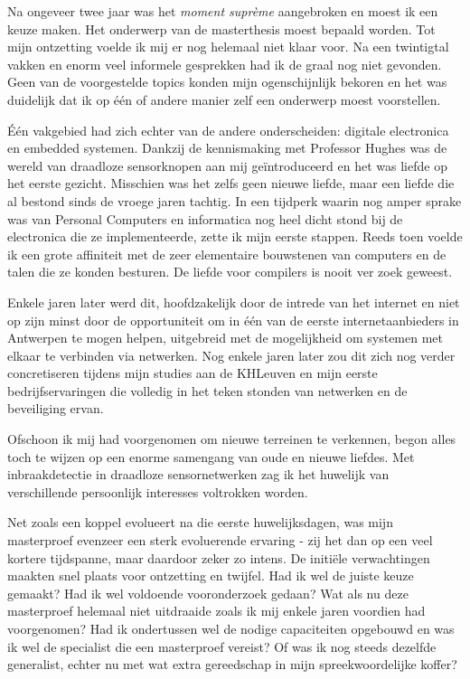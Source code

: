 Na ongeveer twee jaar was het \emph{moment supr\`eme} aangebroken en moest ik
een keuze maken. Het onderwerp van de masterthesis moest bepaald worden. Tot
mijn ontzetting voelde ik mij er nog helemaal niet klaar voor. Na een
twintigtal vakken en enorm veel informele gesprekken had ik de graal nog niet
gevonden. Geen van de voorgestelde topics konden mijn ogenschijnlijk bekoren en
het was duidelijk dat ik op \'e\'en of andere manier zelf een onderwerp moest
voorstellen.

\'E\'en vakgebied had zich echter van de andere onderscheiden: digitale
electronica en embedded systemen. Dankzij de kennismaking met Professor Hughes
was de wereld van draadloze sensorknopen aan mij ge\"introduceerd en het was
liefde op het eerste gezicht. Misschien was het zelfs geen nieuwe liefde, maar
een liefde die al bestond sinds de vroege jaren tachtig. In een tijdperk waarin
nog amper sprake was van Personal Computers en informatica nog heel dicht stond
bij de electronica die ze implementeerde, zette ik mijn eerste stappen. Reeds
toen voelde ik een grote affiniteit met de zeer elementaire bouwstenen van
computers en de talen die ze konden besturen. De liefde voor compilers is nooit
ver zoek geweest.

Enkele jaren later werd dit, hoofdzakelijk door de intrede van het internet en
niet op zijn minst door de opportuniteit om in \'e\'en van de eerste
internetaanbieders in Antwerpen te mogen helpen, uitgebreid met de mogelijkheid
om systemen met elkaar te verbinden via netwerken. Nog enkele jaren later zou
dit zich nog verder concretiseren tijdens mijn studies aan de KHLeuven en mijn
eerste bedrijfservaringen die volledig in het teken stonden van netwerken en de
beveiliging ervan.

Ofschoon ik mij had voorgenomen om nieuwe terreinen te verkennen, begon alles
toch te wijzen op een enorme samengang van oude en nieuwe liefdes. Met
inbraakdetectie in draadloze sensornetwerken zag ik het huwelijk van
verschillende persoonlijk interesses voltrokken worden.

Net zoals een koppel evolueert na die eerste huwelijksdagen, was mijn
masterproef evenzeer een sterk evoluerende ervaring - zij het dan op een veel
kortere tijdspanne, maar daardoor zeker zo intens. De initi\"ele verwachtingen
maakten snel plaats voor ontzetting en twijfel. Had ik wel de juiste keuze
gemaakt? Had ik wel voldoende vooronderzoek gedaan? Wat als nu deze masterproef
helemaal niet uitdraaide zoals ik mij enkele jaren voordien had voorgenomen?
Had ik ondertussen wel de nodige capaciteiten opgebouwd en was ik wel de
specialist die een masterproef vereist? Of was ik nog steeds dezelfde
generalist, echter nu met wat extra gereedschap in mijn spreekwoordelijke
koffer?

